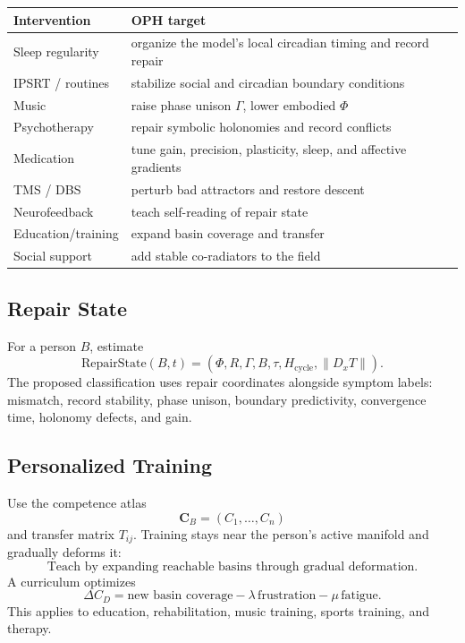 \documentclass[11pt]{article}
\theoremstyle{remark}
\theoremstyle{plain}
\begin{document}
\begin{longtable}{L{0.26\textwidth}L{0.64\textwidth}}
\toprule
\textbf{Intervention} & \textbf{OPH target} \\
\midrule
\endhead
Sleep regularity & organize the model's local circadian timing and record repair \\
IPSRT / routines & stabilize social and circadian boundary conditions \\
Music & raise phase unison \(\Gamma\), lower embodied \(\Phi\) \\
Psychotherapy & repair symbolic holonomies and record conflicts \\
Medication & tune gain, precision, plasticity, sleep, and affective gradients \\
TMS / DBS & perturb bad attractors and restore descent \\
Neurofeedback & teach self-reading of repair state \\
Education/training & expand basin coverage and transfer \\
Social support & add stable co-radiators to the field \\
\bottomrule
\end{longtable}

\subsection{Repair State}

For a person \(B\), estimate
\[
\boxed{
\mathrm{RepairState}(B,t)
=
(\Phi,R,\Gamma,B,\tau,H_{\mathrm{cycle}},\|D_xT\|).
}
\]
The proposed classification uses repair coordinates alongside symptom labels:
mismatch, record stability, phase unison, boundary predictivity, convergence
time, holonomy defects, and gain.

\subsection{Personalized Training}

Use the competence atlas
\[
\mathbf C_B=(C_1,\ldots,C_n)
\]
and transfer matrix \(T_{ij}\). Training stays near the person's active manifold and gradually deforms it:
\[
\boxed{
\text{Teach by expanding reachable basins through gradual deformation.}
}
\]
A curriculum optimizes
\[
\Delta C_D
=
\text{new basin coverage}
-
\lambda\,\text{frustration}
-
\mu\,\text{fatigue}.
\]
This applies to education, rehabilitation, music training, sports training, and therapy.
\end{document}
